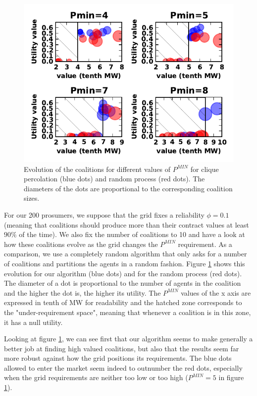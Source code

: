 \documentclass[conference]{IEEEtran}
\begin{document}
\begin{center}
\begin{figure}[b]
  \includegraphics[scale=0.8]{./figure5/coals}
  \caption{Evolution of the coalitions for different values of $ P^{MIN} $ for clique percolation (blue dots) and random process (red dots). The diameters of the dots are proportional to the corresponding coalition sizes.}
  \label{Fig3}
\end{figure}
\end{center}

For our 200 prosumers, we suppose that the grid fixes a reliability $ \phi = 0.1 $ (meaning that coalitions should produce more than their contract values at least $ 90 \% $ of the time). We also fix the number of coalitions to 10 and have a look at how these coalitions evolve as the grid changes the $ P^{MIN} $ requirement. As a comparison, we use a completely random algorithm that only asks for a number of coalitions and partitions the agents in a random fashion. Figure \ref{Fig3} shows this evolution for our algorithm (blue dots) and for the random process (red dots). The diameter of a dot is proportional to the number of agents in the coalition and the higher the dot is, the higher its utility. The $ P^{MIN} $ values of the x axis are expressed in tenth of MW for readability and the hatched zone corresponds to the "under-requirement space", meaning that whenever a coalition is in this zone, it has a null utility. 

Looking at figure \ref{Fig3}, we can see first that our algorithm seems to make generally a better job at finding high valued coalitions, but also that the results seem far more robust against how the grid positions its requirements. The blue dots allowed to enter the market seem indeed to outnumber the red dots, especially when the grid requirements are neither too low or too high ($ P^{MIN} = 5 $ in figure \ref{Fig3}).
\end{document}
